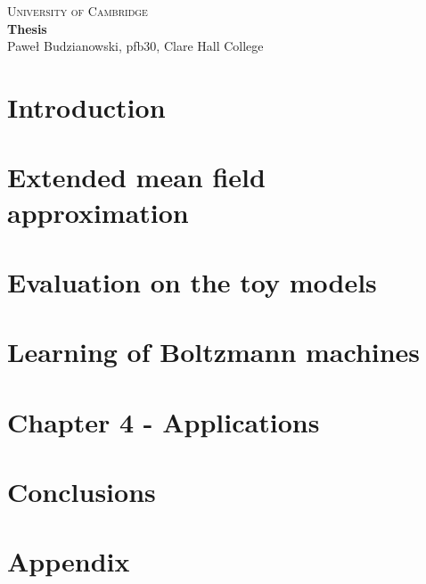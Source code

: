 \documentclass[a4paper]{article}
\begin{document}
\begin{center}
\Large{\textsc{
University of Cambridge}}\\
\vspace{.5cm}
\large\textbf{Thesis}\\
\vspace{.5cm}
\large{Paweł Budzianowski, pfb30, Clare Hall College}\\
\end{center} 

\tableofcontents

\newpage
\section{Introduction}
%

\newpage
\section{Extended mean field approximation}


\newpage
\section{Evaluation on the toy models}
%

\newpage
\section{Learning of Boltzmann machines}


\newpage
\section{Chapter 4 - Applications}
%

\newpage
\section{Conclusions}
%




\newpage
\section{Appendix}




%
%



\end{document}
